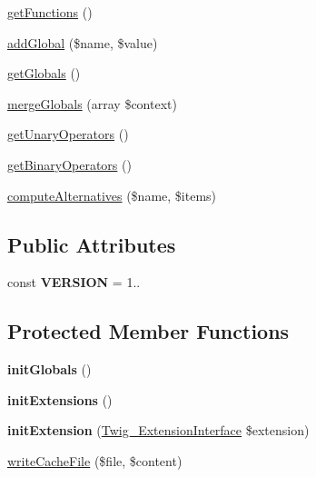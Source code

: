 \begin{DoxyCompactItemize}
\item 
\hyperlink{classTwig__Environment_a8fb90c24fa9858b259cc3a78d2af523c}{get\+Functions} ()
\item 
\hyperlink{classTwig__Environment_a7e988c22e2f7864bcfe6477bd59449f6}{add\+Global} (\$name, \$value)
\item 
\hyperlink{classTwig__Environment_a27f4b903ebde8540fbe1492f732870d1}{get\+Globals} ()
\item 
\hyperlink{classTwig__Environment_a86df97f5c221d4ff2e1d83be9ca8ef97}{merge\+Globals} (array \$context)
\item 
\hyperlink{classTwig__Environment_a3b60316d01afec44b7bab153d06ba167}{get\+Unary\+Operators} ()
\item 
\hyperlink{classTwig__Environment_a18b7c172c7afba18eea444275e25527a}{get\+Binary\+Operators} ()
\item 
\hyperlink{classTwig__Environment_a28cd0f30659366ac08a18788e4c30969}{compute\+Alternatives} (\$name, \$items)
\end{DoxyCompactItemize}
\subsection*{Public Attributes}
\begin{DoxyCompactItemize}
\item 
const {\bfseries V\+E\+R\+S\+I\+ON} = \textquotesingle{}1..\textquotesingle{}\hypertarget{classTwig__Environment_a7d65f6d6006c9647efd08271b49f2e25}{}\label{classTwig__Environment_a7d65f6d6006c9647efd08271b49f2e25}

\end{DoxyCompactItemize}
\subsection*{Protected Member Functions}
\begin{DoxyCompactItemize}
\item 
{\bfseries init\+Globals} ()\hypertarget{classTwig__Environment_a7a2e330f0e6dca7573d3d7041650ed9a}{}\label{classTwig__Environment_a7a2e330f0e6dca7573d3d7041650ed9a}

\item 
{\bfseries init\+Extensions} ()\hypertarget{classTwig__Environment_a4f94d9b4930c0b60818a8e58b1df49dd}{}\label{classTwig__Environment_a4f94d9b4930c0b60818a8e58b1df49dd}

\item 
{\bfseries init\+Extension} (\hyperlink{interfaceTwig__ExtensionInterface}{Twig\+\_\+\+Extension\+Interface} \$extension)\hypertarget{classTwig__Environment_a4865d013d0f298d92ed57b4a4a7f2ce7}{}\label{classTwig__Environment_a4865d013d0f298d92ed57b4a4a7f2ce7}

\item 
\hyperlink{classTwig__Environment_a8d01536c697ba2f5d8526ba4af4ceed4}{write\+Cache\+File} (\$file, \$content)
\end{DoxyCompactItemize}
